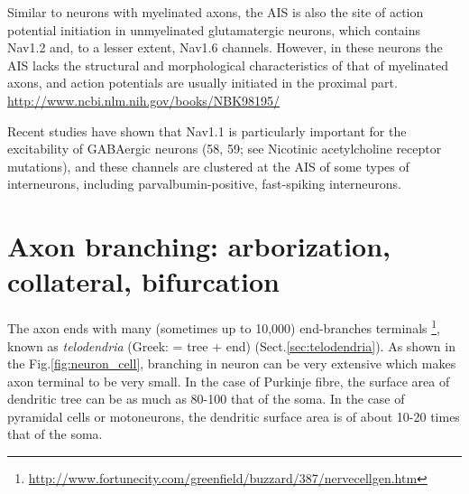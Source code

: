 Similar to neurons with myelinated axons, the AIS is also the site of action
potential initiation in unmyelinated glutamatergic neurons, which contains
Nav1.2 and, to a lesser extent, Nav1.6 channels.
However, in these neurons the AIS lacks the structural and morphological
characteristics of that of myelinated axons, and action potentials are usually initiated in the proximal part.
\url{http://www.ncbi.nlm.nih.gov/books/NBK98195/}

Recent studies have shown that Nav1.1 is particularly important for the
excitability of GABAergic neurons (58, 59; see Nicotinic acetylcholine receptor
mutations), and these channels are clustered at the AIS of some types of
interneurons, including parvalbumin-positive, fast-spiking interneurons.

\section{Axon branching: arborization, collateral, bifurcation}

The axon ends with many (sometimes up to 10,000) end-branches terminals
\footnote{\url{http://www.fortunecity.com/greenfield/buzzard/387/nervecellgen.htm}},
known as {\it telodendria} (Greek: = tree + end) (Sect.\ref{sec:telodendria}).
As shown in the Fig.\ref{fig:neuron_cell}, branching in neuron can be very
extensive which makes axon terminal to be very small.
In the case of Purkinje fibre, the surface area of dendritic tree can be as much
as  80-100 that of the soma. In the case of pyramidal cells or motoneurons, the
dendritic surface area is of about 10-20 times that of the soma.

